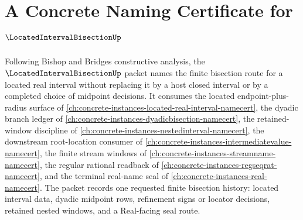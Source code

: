 \chapter{A Concrete Naming Certificate for $\LocatedIntervalBisectionUp$}
\label{ch:concrete-instances-located-interval-bisection-namecert}

Following Bishop and Bridges constructive analysis, the $\LocatedIntervalBisectionUp$ packet names the finite bisection route for a located real interval without replacing it by a host closed interval or by a completed choice of midpoint decisions. It consumes the located endpoint-plus-radius surface of \autoref{ch:concrete-instances-located-real-interval-namecert}, the dyadic branch ledger of \autoref{ch:concrete-instances-dyadicbisection-namecert}, the retained-window discipline of \autoref{ch:concrete-instances-nestedinterval-namecert}, the downstream root-location consumer of \autoref{ch:concrete-instances-intermediatevalue-namecert}, the finite stream windows of \autoref{ch:concrete-instances-streamname-namecert}, the regular rational readback of \autoref{ch:concrete-instances-regseqrat-namecert}, and the terminal real-name seal of \autoref{ch:concrete-instances-real-namecert}. The packet records one requested finite bisection history: located interval data, dyadic midpoint rows, refinement signs or locator decisions, retained nested windows, and a Real-facing seal route.

